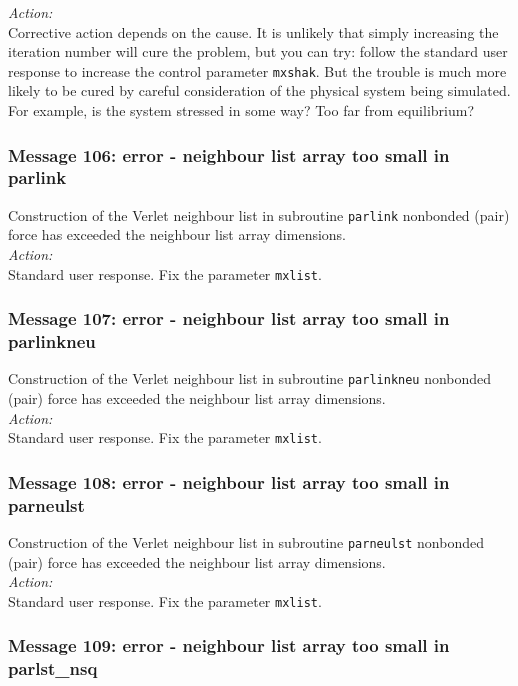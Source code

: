 \noindent
{\em Action:} 
\\ Corrective action depends on
the cause. It is unlikely that simply increasing the iteration number
will cure the problem, but you can try: follow the standard user
response to increase the control parameter {\tt mxshak}. But the
trouble is much more likely to be cured by careful consideration of
the physical system being simulated. For example, is the system
stressed in some way? Too far from equilibrium?

\subsubsection*{Message 106: error - neighbour list array too small in
          parlink}

Construction of the Verlet neighbour list 
in subroutine {\tt parlink} nonbonded (pair) force has exceeded the
neighbour list array dimensions. \\

\noindent
{\em Action:} \\ 
Standard user response. Fix the parameter {\tt mxlist}.

\subsubsection*{Message 107: error - neighbour list array too small in
          parlinkneu}

Construction of the Verlet neighbour list 
in subroutine {\tt parlinkneu} nonbonded (pair) force has exceeded the
neighbour list array dimensions. \\

\noindent
{\em Action:} \\ 
Standard user response. Fix the parameter {\tt mxlist}.

\subsubsection*{Message 108: error - neighbour list array too small in
          parneulst}

Construction of the Verlet neighbour list 
in subroutine {\tt parneulst} nonbonded (pair) force has exceeded the
neighbour list array dimensions. \\

\noindent
{\em Action:} \\ 
Standard user response. Fix the parameter {\tt mxlist}.

\subsubsection*{Message 109: error - neighbour list array too small in
          parlst\_nsq}

